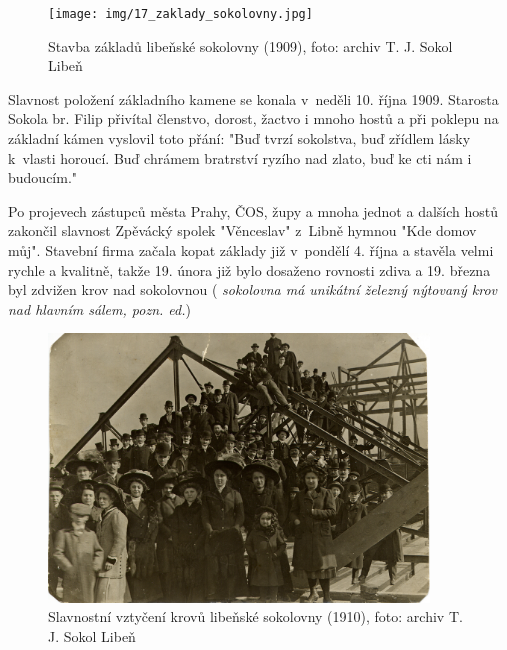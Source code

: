 \documentclass[a5paper, 11pt, twoside]{article}
\newcommand{\pozned}[1]{%
\textit{#1}}
\begin{document}
\begin{figure}[h!]
  \centering 
  \texttt{[image: img/17\_zaklady\_sokolovny.jpg]}
  \caption*{Stavba základů libeňské sokolovny (1909), foto: archiv T. J. Sokol
  Libeň}
\end{figure}

Slavnost položení základního kamene se konala v~neděli 10. října 1909.
Starosta Sokola br. Filip přivítal členstvo, dorost, žactvo i mnoho
hostů a při poklepu na základní kámen vyslovil toto přání: "Buď tvrzí
sokolstva, buď zřídlem lásky k~vlasti horoucí. Buď chrámem bratrství
ryzího nad zlato, buď ke cti nám i budoucím."

Po projevech zástupců města Prahy, ČOS, župy a mnoha jednot a dalších
hostů zakončil slavnost Zpěvácký spolek "Věnceslav" z~Libně hymnou "Kde
domov můj". Stavební firma začala kopat základy již v~pondělí 4. října
a stavěla velmi rychle a kvalitně, takže 19. února již bylo dosaženo
rovnosti zdiva a 19. března byl zdvižen krov nad sokolovnou
(\pozned{sokolovna má unikátní železný nýtovaný krov nad hlavním sálem,
pozn. ed.})

\begin{figure}[h!]
  \centering 
  \includegraphics[width=0.9\textwidth]{img/18_krovy_sokolovny.jpg}
  \caption*{Slavnostní vztyčení krovů libeňské sokolovny (1910), foto: archiv T. J. Sokol Libeň}
\end{figure}
\end{document}
